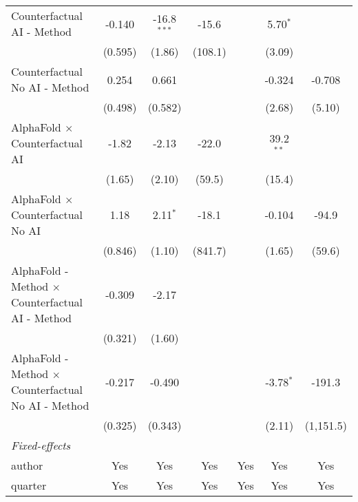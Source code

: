 \begin{tabular}{lcccccc}
   Counterfactual AI - Method                                 & -0.140  & -16.8$^{***}$ & -15.6        &        & 5.70$^{*}$    &   \\   
                                                              & (0.595) & (1.86)        & (108.1)      &        & (3.09)        &   \\   
   Counterfactual No AI - Method                              & 0.254   & 0.661         &              &        & -0.324        & -0.708\\   
                                                              & (0.498) & (0.582)       &              &        & (2.68)        & (5.10)\\   
   AlphaFold $\times$ Counterfactual AI                       & -1.82   & -2.13         & -22.0        &        & 39.2$^{**}$   &   \\   
                                                              & (1.65)  & (2.10)        & (59.5)       &        & (15.4)        &   \\   
   AlphaFold $\times$ Counterfactual No AI                    & 1.18    & 2.11$^{*}$    & -18.1        &        & -0.104        & -94.9\\   
                                                              & (0.846) & (1.10)        & (841.7)      &        & (1.65)        & (59.6)\\   
   AlphaFold - Method $\times$ Counterfactual AI - Method     & -0.309  & -2.17         &              &        &               &   \\   
                                                              & (0.321) & (1.60)        &              &        &               &   \\   
   AlphaFold - Method $\times$ Counterfactual No AI - Method  & -0.217  & -0.490        &              &        & -3.78$^{*}$   & -191.3\\   
                                                              & (0.325) & (0.343)       &              &        & (2.11)        & (1,151.5)\\   
   \midrule
   \emph{Fixed-effects}\\
   author                                                     & Yes     & Yes           & Yes          & Yes    & Yes           & Yes\\  
   quarter                                                    & Yes     & Yes           & Yes          & Yes    & Yes           & Yes\\  
   \midrule

\end{tabular}
